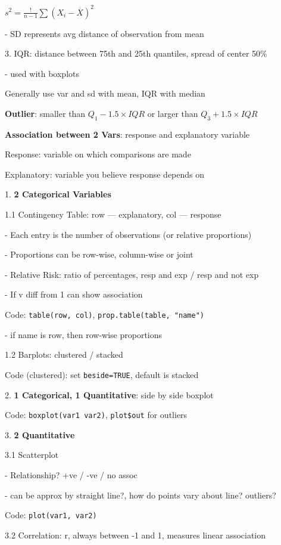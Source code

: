 \documentclass[10pt, a4paper]{article}
\newcommand{\tab}[0]{\hspace*{2mm}}
\begin{document}
\begin{multicols*}{3}
		\centerline{$s^2 = \frac{!}{n - 1} \sum (X_i - \overline{X})^2$}

		\tab{} - SD represents avg distance of observation from mean

		3. IQR: distance between 75th and 25th quantiles, spread of center 50\% 

		\tab{} - used with boxplots

		Generally use var and sd with mean, IQR with median

		\textbf{Outlier}: smaller than $Q_1 - 1.5 \times IQR$ or larger than $Q_3 + 1.5 \times IQR$

		\textbf{Association between 2 Vars}: response and explanatory variable

		Response: variable on which comparisons are made

		Explanatory: variable you believe response depends on

		1. \textbf{2 Categorical Variables}

		1.1 Contingency Table: row --- explanatory, col --- response

		\tab{} - Each entry is the number of observations (or relative proportions)

		\tab{} - Proportions can be row-wise, column-wise or joint

		\tab{} - Relative Risk: ratio of percentages, resp and exp / resp and not exp 

		\tab{} - If v diff from 1 can show association

		Code: \texttt{table(row, col)}, \texttt{prop.table(table, "name")}

		\tab{} - if name is row, then row-wise proportions

		1.2 Barplots: clustered / stacked

		Code (clustered): set \texttt{beside=TRUE}, default is stacked

		2. \textbf{1 Categorical, 1 Quantitative}: side by side boxplot

		Code: \texttt{boxplot(var1~var2)}, \texttt{plot\$out} for outliers

		3. \textbf{2 Quantitative}

		3.1 Scatterplot

		\tab{} - Relationship? +ve / -ve / no assoc
		
		\tab{} - can be approx by straight line?, how do points vary about line? outliers?

		Code: \texttt{plot(var1, var2)}

		3.2 Correlation: r, always between -1 and 1, measures linear association


\end{multicols*}
\end{document}
